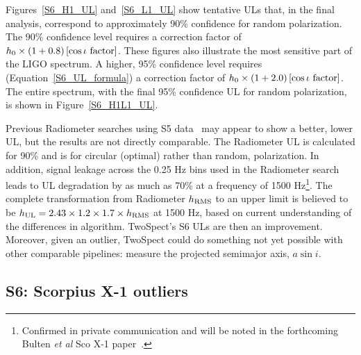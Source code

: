 Figures~\ref{S6_H1_UL} and~\ref{S6_L1_UL} show tentative ULs that, in the final analysis, correspond to approximately 90\% confidence for random polarization.
The 90\% confidence level requires a correction factor of $h_0 \times \left(1+0.8 \right) \left[\cos \iota \textup{ factor} \right]$.
These figures also illustrate the most sensitive part of the LIGO spectrum.
A higher, 95\% confidence level requires (Equation~\ref{S6_UL_formula}) a correction factor of $h_0 \times \left(1+2.0 \right) \left[\cos \iota \textup{ factor} \right]$.
The entire spectrum, with the final 95\% confidence UL for random polarization, is shown in Figure~\ref{S6_H1L1_UL}.

Previous Radiometer searches using S5 data~\cite{AbadieStoch2011} may appear to show a better, lower UL, but the results are not directly comparable.
The Radiometer UL is calculated for 90\% and is for circular (optimal) rather than random, polarization.
In addition, signal leakage across the 0.25 Hz bins used in the Radiometer search leads to UL degradation by as much as 70\% at a frequency of 1500 Hz\footnote{Confirmed in private communication and will be noted in the forthcoming Bulten \textit{et al} Sco X-1 paper~\cite{ScoX1MDC2014DCC}.}.
The complete transformation from Radiometer $h_\textup{RMS}$ to an upper limit is believed to be $h_\textup{UL} = 2.43\times1.2\times1.7\times h_\textup{RMS}$ at 1500 Hz, based on current understanding of the differences in algorithm.
TwoSpect's S6 ULs are then an improvement.
Moreover, given an outlier, TwoSpect could do something not yet possible with other comparable pipelines: measure the projected semimajor axis, $a \sin i$.

\subsection{S6: Scorpius X-1 outliers}

